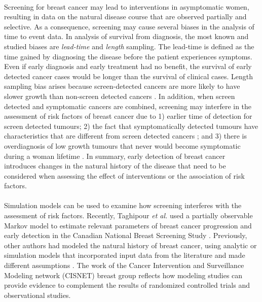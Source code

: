 \paragraph{}Screening for breast cancer may lead to interventions in asymptomatic women, resulting in data on the natural disease course that are observed partially and selective. As a consequence, screening may cause several biases in the analysis of time to event data. In analysis of survival from diagnosis, the most known and studied biases are \textit{lead-time} and \textit{length} sampling. The lead-time is defined as the time gained by diagnosing the disease before the patient experiences symptoms. Even if early diagnosis and early treatment had no benefit, the survival of early detected cancer cases would be longer than the survival of clinical cases. Length sampling bias arises because screen-detected cancers are more likely to have slower growth than non-screen detected cancers \cite{Zelen1969}. In addition, when screen detected and symptomatic cancers are combined, screening may interfere in the assessment of risk factors of breast cancer due to 1) earlier time of detection for screen detected tumours; 2) the fact that symptomatically detected tumours have characteristics that are different from screen detected cancers \cite{Blanch2014}; and 3) there is overdiagnosis of low growth tumours that never would become symptomatic during a woman lifetime \cite{Esserman2013a}. In summary, early detection of breast cancer introduces changes in the natural history of the disease that need to be considered when assessing the effect of interventions or the association of risk factors.

\paragraph{}Simulation models can be used to examine how screening interferes with the assessment of risk factors. Recently, Taghipour \textit{et al.} used a partially observable Markov model to estimate relevant parameters of breast cancer progression and early detection in the Canadian National Breast Screening Study \cite{Taghipour2013}. Previously, other authors had modeled the natural history of breast cancer, using analytic or simulation models that incorporated input data from the literature and made different assumptions \cite{Zelen1969,Chen1996,Shen2001,Lee2003b,Berry2006,Fryback2006,Hanin2006,Lee2006,Mandelblatt2006, Plevritis2006,Weedon-Fekjaer2008a}. The work of the Cancer Intervention and Surveillance Modeling network (CISNET) breast group \cite{Berry2006,Fryback2006,Hanin2006,Lee2006,Mandelblatt2006, Plevritis2006} reflects how modeling studies can provide evidence to complement the results of randomized controlled trials and observational studies. 

